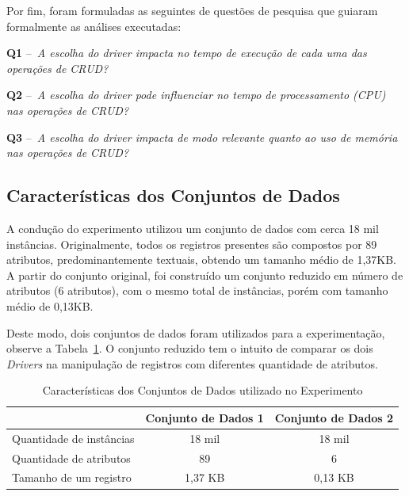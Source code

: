 \documentclass[12pt]{article}
\begin{document}
Por fim, foram formuladas as seguintes de questões de pesquisa que guiaram formalmente as análises executadas: 

\textbf{Q1} --~\emph{A escolha do driver impacta no tempo de execução de cada uma das operações de CRUD?}

\textbf{Q2} --~\emph{A escolha do driver pode influenciar no tempo de processamento (CPU) nas operações de CRUD?}

\textbf{Q3} --~\emph{A escolha do driver impacta de modo relevante quanto ao uso de memória nas operações de CRUD?}

\subsection{Características dos Conjuntos de Dados}

A condução do experimento utilizou um conjunto de dados com cerca 18 mil instâncias.%
Originalmente, todos os registros presentes são compostos por 89 atributos, predominantemente textuais, obtendo um tamanho médio de 1,37KB. 
A partir do conjunto original, foi construído um conjunto reduzido em número de atributos (6 atributos), com o mesmo total de instâncias, porém com tamanho médio de 0,13KB. 

Deste modo, dois conjuntos de dados foram utilizados para a experimentação, observe a Tabela~\ref{tab:conjunto-dados}. 
O conjunto reduzido tem o intuito de comparar os dois \emph{Drivers} na manipulação de registros com diferentes quantidade de atributos.

\begin{table}[ht]
\centering
\caption{Características dos Conjuntos de Dados utilizado no Experimento}
\label{tab:conjunto-dados}
\begin{tabular}{c|c|c|}
\cline{2-3}
                         & \textbf{Conjunto de Dados 1} & \textbf{Conjunto de Dados 2} \\ \hline
\multicolumn{1}{|l|}{Quantidade de instâncias} & 18 mil   		 			& 18 mil            \\ \hline
\multicolumn{1}{|l|}{Quantidade de atributos}  & 89        		 			& 6                  \\ \hline
\multicolumn{1}{|l|}{Tamanho de um registro}   & 1,37 KB        				& 0,13 KB                    \\ \hline
\end{tabular}
\end{table}
\end{document}
